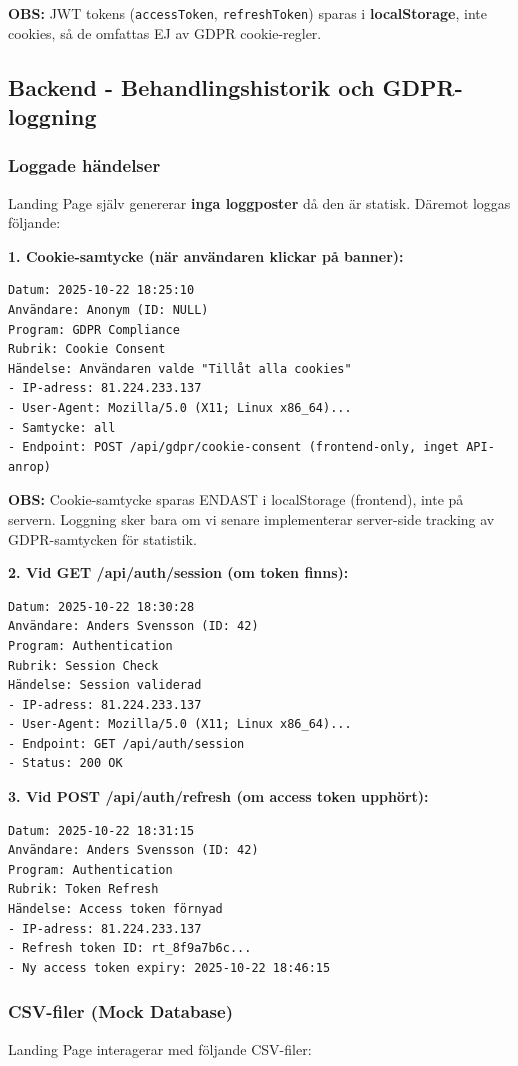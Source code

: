 \documentclass[12pt,a4paper]{article}
\begin{document}
\textbf{OBS:} JWT tokens (\texttt{accessToken}, \texttt{refreshToken}) sparas i \textbf{localStorage}, inte cookies, så de omfattas EJ av GDPR cookie-regler.

\subsection{Backend - Behandlingshistorik och GDPR-loggning}

\subsubsection{Loggade händelser}
Landing Page själv genererar \textbf{inga loggposter} då den är statisk. Däremot loggas följande:

\textbf{1. Cookie-samtycke (när användaren klickar på banner):}
\begin{verbatim}
Datum: 2025-10-22 18:25:10
Användare: Anonym (ID: NULL)
Program: GDPR Compliance
Rubrik: Cookie Consent
Händelse: Användaren valde "Tillåt alla cookies"
- IP-adress: 81.224.233.137
- User-Agent: Mozilla/5.0 (X11; Linux x86_64)...
- Samtycke: all
- Endpoint: POST /api/gdpr/cookie-consent (frontend-only, inget API-anrop)
\end{verbatim}

\textbf{OBS:} Cookie-samtycke sparas ENDAST i localStorage (frontend), inte på servern. Loggning sker bara om vi senare implementerar server-side tracking av GDPR-samtycken för statistik.

\textbf{2. Vid GET /api/auth/session (om token finns):}
\begin{verbatim}
Datum: 2025-10-22 18:30:28
Användare: Anders Svensson (ID: 42)
Program: Authentication
Rubrik: Session Check
Händelse: Session validerad
- IP-adress: 81.224.233.137
- User-Agent: Mozilla/5.0 (X11; Linux x86_64)...
- Endpoint: GET /api/auth/session
- Status: 200 OK
\end{verbatim}

\textbf{3. Vid POST /api/auth/refresh (om access token upphört):}
\begin{verbatim}
Datum: 2025-10-22 18:31:15
Användare: Anders Svensson (ID: 42)
Program: Authentication
Rubrik: Token Refresh
Händelse: Access token förnyad
- IP-adress: 81.224.233.137
- Refresh token ID: rt_8f9a7b6c...
- Ny access token expiry: 2025-10-22 18:46:15
\end{verbatim}

\subsubsection{CSV-filer (Mock Database)}
Landing Page interagerar med följande CSV-filer:
\end{document}
